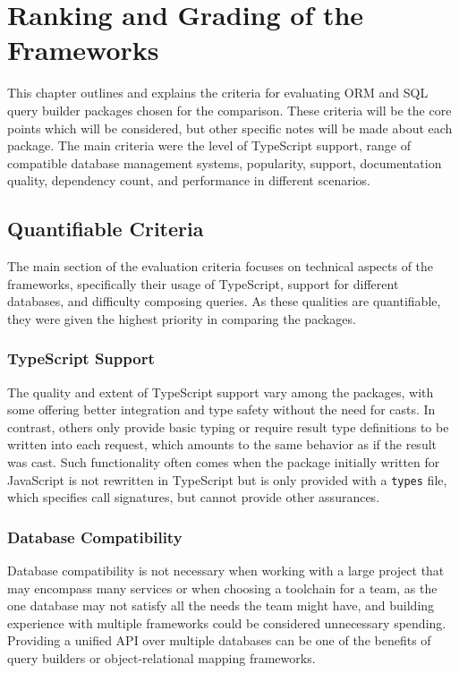 \chapter{Ranking and Grading of the Frameworks}

This chapter outlines and explains the criteria for evaluating ORM and SQL query
builder packages chosen for the comparison. These criteria will be the core
points which will be considered, but other specific notes will be made about
each package. The main criteria were the level of TypeScript support, range of
compatible database management systems, popularity, support, documentation
quality, dependency count, and performance in different scenarios.

\section{Quantifiable Criteria}

The main section of the evaluation criteria focuses on technical aspects of the
frameworks, specifically their usage of TypeScript, support for different
databases, and difficulty composing queries. As these qualities are
quantifiable, they were given the highest priority in comparing the packages.

\subsection{TypeScript Support}

The quality and extent of TypeScript support vary among the packages, with some
offering better integration and type safety without the need for casts. In
contrast, others only provide basic typing or require result type definitions to
be written into each request, which amounts to the same behavior as if the
result was cast. Such functionality often comes when the package initially
written for JavaScript is not rewritten in TypeScript but is only provided with
a \texttt{types} file, which specifies call signatures, but cannot provide other
assurances.

\subsection{Database Compatibility}

Database compatibility is not necessary when working with a large project that
may encompass many services or when choosing a toolchain for a team, as the one
database may not satisfy all the needs the team might have, and building
experience with multiple frameworks could be considered unnecessary spending.
Providing a unified API over multiple databases can be one of the benefits of
query builders or object-relational mapping frameworks.

